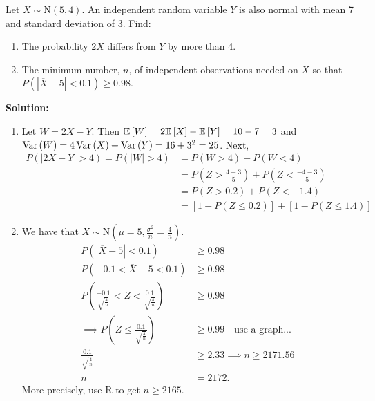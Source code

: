 \begin{example}
    Let $X \sim \text{N}(5,4)$. An independent random variable $Y$ is also normal with mean 7 and standard deviation of 3. Find:
    \begin{enumerate}[label=(\alph*)]
        \item The probability $2X$ differs from $Y$ by more than 4.
        \item The minimum number, $n$, of independent observations needed on $X$ so that $P(|\overline{X} -5| < 0.1) \geq 0.98$.
    \end{enumerate}
    \pagebreak

    \textbf{Solution:}
    \begin{enumerate}[label=(\alph*)]
        \item Let $W = 2X - Y$. Then $\mathbb{E}\left[{W}\right] = 2\mathbb{E}\left[{X}\right] - \mathbb{E}\left[{Y}\right] = 10 - 7 = 3$ and $\operatorname{Var}\left({W}\right) = 4\operatorname{Var}\left({X}\right) + \operatorname{Var}\left({Y}\right) = 16 + 3^2 = 25$. Next, \vspace{-3mm}
        \begin{align*}
            P(|2X - Y|> 4) = P(|W|>4) &= P(W>4) + P(W<4) \\
            &= P(Z > \frac{4-3}{5}) + P(Z < \frac{-4-3}{5}) \\
            &= P(Z > 0.2) + P(Z < -1.4) \\
            &= \left[ 1 - P(Z \leq 0.2) \right] + \left[ 1 - P(Z \leq 1.4) \right]
        \end{align*}
        \item We have that $\overline{X} \sim \text{N}(\mu = 5, \frac{\sigma^2}{n} = \frac{4}{n})$. 
        \begin{align*}
            P(|\overline{X} -5| < 0.1) &\geq 0.98 \\
            P(-0.1 < \overline{X} - 5 < 0.1) &\geq 0.98 \\
            P(\frac{-0.1}{\sqrt{\frac{4}{n}}} < Z < \frac{0.1}{\sqrt{\frac{4}{n}}}) &\geq 0.98 \\
            \implies P(Z \leq \frac{0.1}{\sqrt{\frac{4}{n}}}) &\geq 0.99 \quad \text{use a graph...} \\
            \frac{0.1}{\sqrt{\frac{4}{n}}} &\geq 2.33 \implies n \geq 2171.56 \\
            n &= 2172.
        \end{align*}
        More precisely, use R to get $n \geq 2165$.
    \end{enumerate}
\end{example}


\pagebreak

